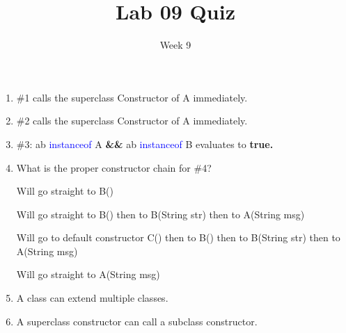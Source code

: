 \documentclass[addpoints]{exam}
\title{Lab 09 Quiz}
\date{Week 9}
\begin{document}
 

\Instructions

\begin{enumerate}
\vspace{2em}

Consider the following code for questions 1, 2, 3 and 4.
\begin{lstlisting}
class A  {
    public A(String msg)  { }
}  
class B extends A  {
    public B() {
         this("Hello World");		/* #1 */
    }
    public B(String str) {
        super(str);				    /* #2 */
    }
}  
class C extends B {
	public static void main(String[] args) {
    		A ab = new B();			/* #3 */
			C c = new C(); 		/* #4 */
	}
}
\end{lstlisting}

\item {} \tf  \#1 calls the superclass Constructor of A immediately.
\vspace{1em}


\item {} \tf  \#2 calls the superclass Constructor of A immediately.
\vspace{1em}


\item {} \tf \#3: ab \textcolor{blue}{instanceof} A \textbf{\&\&} ab \textcolor{blue}{instanceof} B  evaluates to  \textbf{true.}
\vspace{1em}


\item

\question {} What is the proper constructor chain for \#4?

\begin{oneparchoices} 
\hspace{0.2cm}
 \choice Will go straight to B()\newline
 
 \choice Will go straight to B() then to B(String str) then to A(String msg) \newline
 
 \choice Will go to default constructor C() then to B() then to B(String str) then to A(String msg) \newline
 
 \choice Will go straight to A(String msg) \newline

\end{oneparchoices}

\item {} \tf A class can extend multiple classes.


\vspace{1em}
\item {} \tf A superclass constructor can call a subclass constructor.



\vspace{2em}
\end{enumerate}
\end{document}
